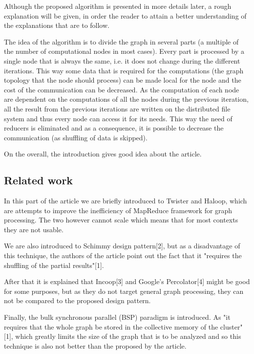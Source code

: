 \documentclass[12pt]{article}
\theoremstyle{plain}
\begin{document}
  Although the proposed algorithm is presented in more details later, a rough
  explanation will be given, in order the reader to attain a better
  understanding of the explanations that are to follow.

  The idea of the algorithm is to divide the graph in several parts (a multiple
  of the number of computational nodes in most cases). Every part is processed
  by a single node that is always the same, i.e. it does not change during the
  different iterations. This way some data that is required for the computations
  (the graph topology that the node should process) can be made local for the
  node and the cost of the communication can be decreased. As the computation of
  each node are dependent on the computations of all the nodes during the previous 
  iteration, all the result from the previous iterations are written on the 
  distributed file system and thus every node can access it for its needs. This
  way the need of reducers is eliminated and as a consequence, it is possible to
  decrease the communication (as shuffling of data is skipped).

  On the overall, the introduction gives good idea about the article.

\subsection{Related work} %
\label{sub:Related work}
  In this part of the article we are briefly introduced to Twister and Haloop,
  which are attempts to improve the inefficiency of MapReduce framework for 
  graph processing. The two however cannot scale which means that for most 
  contexts they are not usable.

  We are also introduced to Schimmy design pattern[2], but as a disadvantage of
  this technique, the authors of the article point out the fact that it
  "requires the shuffling of the partial results"[1].

  After that it is explained that Incoop[3] and Google's Percolator[4] might be
  good for some purposes, but as they do not target general graph processing, 
  they can not be compared to the proposed design pattern.

  Finally, the bulk synchronous parallel (BSP) paradigm is introduced. As "it
  requires that the whole graph be stored in the collective memory of the
  cluster"[1], which greatly limits the size of the graph that is to be analyzed
  and so this technique is also not better than the proposed by the article.
\end{document}
